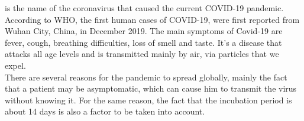 

\sar is the name of the coronavirus that caused the current COVID-19 pandemic. According to \ac{WHO}, the first human cases of COVID-19, were first reported from Wuhan City, China, in December 2019. 
The main symptoms of Covid-19 are fever, cough, breathing difficulties, loss of smell and taste. 
It's a disease that attacks all age levels and is transmitted mainly by air, via particles that we expel. \\
There are several reasons for the pandemic to spread globally, mainly the fact that a patient may be asymptomatic, which can cause him to transmit the virus without knowing it. For the same reason, the fact that the incubation period is about 14 days is also a factor to be taken into account. 